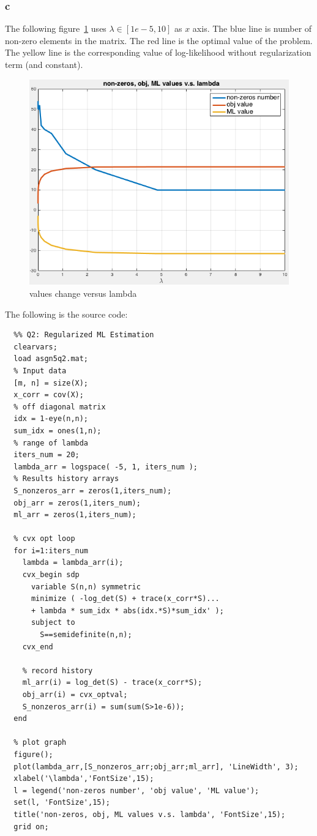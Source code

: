 \documentclass[10pt,a4paper]{article}
\begin{document}
\subsubsection{c}
The following figure~\ref{fig:q2vs} uses $\lambda\in [1e-5,10]$ as $x$
axis. The blue line is number of non-zero elements in the
matrix. The red line is the optimal value of the problem.
The yellow line is the corresponding value of log-likelihood
without regularization term (and constant).
\begin{figure}
  \centering
	\includegraphics[width=0.7\linewidth]{Q2_vslambda.png}
  \caption{values change versus lambda}
  \label{fig:q2vs}
\end{figure}

The following is the source code:

\begin{lstlisting}
  %% Q2: Regularized ML Estimation
  clearvars;
  load asgn5q2.mat;
  % Input data
  [m, n] = size(X);
  x_corr = cov(X);
  % off diagonal matrix
  idx = 1-eye(n,n);
  sum_idx = ones(1,n);
  % range of lambda
  iters_num = 20;
  lambda_arr = logspace( -5, 1, iters_num );
  % Results history arrays
  S_nonzeros_arr = zeros(1,iters_num);
  obj_arr = zeros(1,iters_num);
  ml_arr = zeros(1,iters_num);

  % cvx opt loop
  for i=1:iters_num
    lambda = lambda_arr(i);
    cvx_begin sdp
      variable S(n,n) symmetric 
      minimize ( -log_det(S) + trace(x_corr*S)...
      + lambda * sum_idx * abs(idx.*S)*sum_idx' );
      subject to
        S==semidefinite(n,n);
    cvx_end

    % record history
    ml_arr(i) = log_det(S) - trace(x_corr*S);
    obj_arr(i) = cvx_optval;
    S_nonzeros_arr(i) = sum(sum(S>1e-6));
  end

  % plot graph
  figure();
  plot(lambda_arr,[S_nonzeros_arr;obj_arr;ml_arr], 'LineWidth', 3);
  xlabel('\lambda','FontSize',15);
  l = legend('non-zeros number', 'obj value', 'ML value');
  set(l, 'FontSize',15);
  title('non-zeros, obj, ML values v.s. lambda', 'FontSize',15);
  grid on;
\end{lstlisting}
\end{document}
